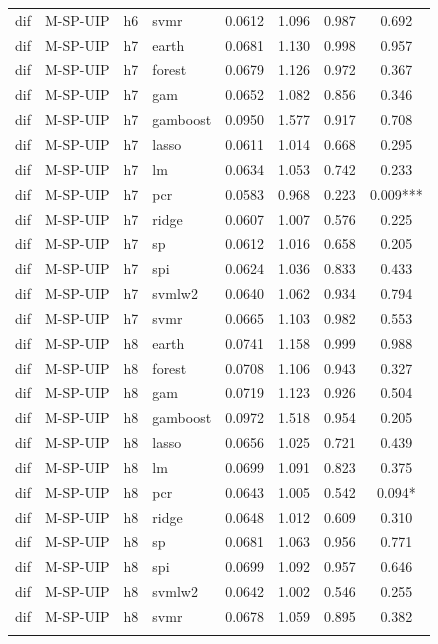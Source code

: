 \begin{ThreePartTable}
\begin{longtable}[t]{llclcccc}
dif & M-SP-UIP & h6 & svmr & 0.0612 & 1.096 & 0.987 & 0.692\\
\addlinespace
dif & M-SP-UIP & h7 & earth & 0.0681 & 1.130 & 0.998 & 0.957\\
dif & M-SP-UIP & h7 & forest & 0.0679 & 1.126 & 0.972 & 0.367\\
dif & M-SP-UIP & h7 & gam & 0.0652 & 1.082 & 0.856 & 0.346\\
dif & M-SP-UIP & h7 & gamboost & 0.0950 & 1.577 & 0.917 & 0.708\\
dif & M-SP-UIP & h7 & lasso & 0.0611 & 1.014 & 0.668 & 0.295\\
dif & M-SP-UIP & h7 & lm & 0.0634 & 1.053 & 0.742 & 0.233\\
dif & M-SP-UIP & h7 & pcr & 0.0583 & 0.968 & 0.223 & 0.009***\\
dif & M-SP-UIP & h7 & ridge & 0.0607 & 1.007 & 0.576 & 0.225\\
dif & M-SP-UIP & h7 & sp & 0.0612 & 1.016 & 0.658 & 0.205\\
dif & M-SP-UIP & h7 & spi & 0.0624 & 1.036 & 0.833 & 0.433\\
dif & M-SP-UIP & h7 & svmlw2 & 0.0640 & 1.062 & 0.934 & 0.794\\
dif & M-SP-UIP & h7 & svmr & 0.0665 & 1.103 & 0.982 & 0.553\\
\addlinespace
dif & M-SP-UIP & h8 & earth & 0.0741 & 1.158 & 0.999 & 0.988\\
dif & M-SP-UIP & h8 & forest & 0.0708 & 1.106 & 0.943 & 0.327\\
dif & M-SP-UIP & h8 & gam & 0.0719 & 1.123 & 0.926 & 0.504\\
dif & M-SP-UIP & h8 & gamboost & 0.0972 & 1.518 & 0.954 & 0.205\\
dif & M-SP-UIP & h8 & lasso & 0.0656 & 1.025 & 0.721 & 0.439\\
dif & M-SP-UIP & h8 & lm & 0.0699 & 1.091 & 0.823 & 0.375\\
dif & M-SP-UIP & h8 & pcr & 0.0643 & 1.005 & 0.542 & 0.094*\\
dif & M-SP-UIP & h8 & ridge & 0.0648 & 1.012 & 0.609 & 0.310\\
dif & M-SP-UIP & h8 & sp & 0.0681 & 1.063 & 0.956 & 0.771\\
dif & M-SP-UIP & h8 & spi & 0.0699 & 1.092 & 0.957 & 0.646\\
dif & M-SP-UIP & h8 & svmlw2 & 0.0642 & 1.002 & 0.546 & 0.255\\
dif & M-SP-UIP & h8 & svmr & 0.0678 & 1.059 & 0.895 & 0.382\\
\addlinespace

\end{longtable}
\end{ThreePartTable}
